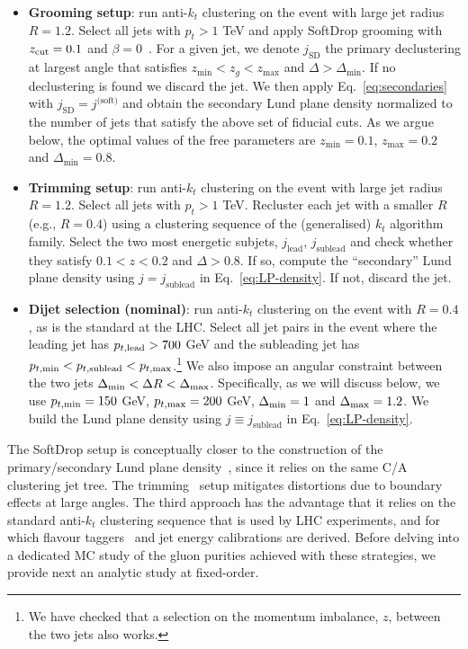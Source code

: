 \documentclass[a4paper,11pt]{article}
\begin{document}
\begin{itemize}
    \item \textbf{Grooming setup}: run anti-$k_t$ clustering \cite{Cacciari:2008gp} on the event with large jet radius $R = 1.2$. Select all jets with $p_t > 1 $ TeV and apply SoftDrop grooming with $z_{\rm{cut}} = 0.1$ and $\beta = 0$~\cite{Dasgupta:2013ihk,Larkoski:2014wba}. For a given jet, we denote $j_{\text{SD}}$ the primary declustering at largest angle that satisfies $z_{\text{min}} <z_g< z_{\text{max}}$ and $\Delta > \Delta_{\text{min}}$. If no declustering is found we discard the jet. We then apply Eq.~\eqref{eq:secondaries} with $j_{\text{SD}}=j^{\text{(soft)}}$ and obtain the secondary Lund plane density normalized to the number of jets that satisfy the above set of fiducial cuts.  
    As we argue below, the optimal values of the free parameters are $z_{\text {min}}=0.1$, $z_{\text {max}}=0.2$ and $\Delta_{\text{min}}=0.8$.
    \item \textbf{Trimming setup}: run anti-$k_t$ clustering on the event with large jet radius $R = 1.2$. Select all jets with $p_t > 1 $ TeV. Recluster each jet with a smaller $R$ (e.g., $R = 0.4$) using a clustering sequence of the (generalised) $k_t$ algorithm family. Select the two most energetic subjets, $j_{\text {lead}}$, $j_{\text{sublead}}$ and check whether they satisfy $0.1 < z < 0.2$ and $\Delta > 0.8$. If so, compute the ``secondary'' Lund plane density using $j=j_{\text{sublead}}$ in Eq.~\eqref{eq:LP-density}. If not, discard the jet. 
    \item \textbf{Dijet selection (nominal)}: run anti-$k_t$ clustering on the event with $R = 0.4$, as is the standard at the LHC. Select all jet pairs in the event where the leading jet has $p_{t,{\rm lead}} > 700$ GeV and the subleading jet has $p_{t,{\rm min}} < p_{t,{\rm sublead}} < p_{t,{\rm max}}$.\footnote{We have checked that a selection on the momentum imbalance, $z$, between the two jets also works.} We also impose an angular constraint between the two jets $\Delta_{\rm min} < \Delta R < \Delta_{\rm max}$. Specifically, as we will discuss below, we use  $p_{t,{\rm min}}=150$ GeV, $p_{t,{\rm max}}=200$ GeV, $\Delta_{\rm min} = 1$ and $\Delta_{\rm max} = 1.2$.
    We build the Lund plane density using $j\equiv j_\text{sublead}$ in Eq.~\eqref{eq:LP-density}.
\end{itemize}

The SoftDrop setup is conceptually closer to the construction of the primary/secondary Lund plane density~\cite{Dreyer:2018nbf}, since it relies on the same C/A clustering jet tree. The trimming~\cite{Krohn:2009th} setup mitigates distortions due to boundary effects at large angles. The third approach has the advantage that it relies on the standard anti-$k_t$ clustering sequence that is used by LHC experiments, and for which flavour taggers~\cite{CMS:2017wtu,Qu:2019gqs,ATLAS:2022qxm,ATLAS:2025dkv} and jet energy calibrations are derived. Before delving into a dedicated MC study of the gluon purities achieved with these strategies, we provide next an analytic study at fixed-order.   
\end{document}

